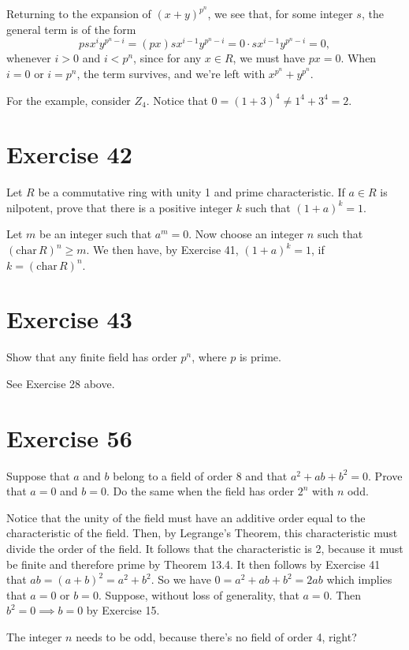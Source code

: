\documentclass[12pt]{article}
\newcommand{\chr}{\mbox{char}\,}
\begin{document}
Returning to the expansion of $(x+y)^{p^n}$, we see that, for some
integer $s$, the general term is of the form
\begin{equation*}
psx^iy^{p^n-i}=(px)sx^{i-1}y^{p^n-i}=0\cdot sx^{i-1}y^{p^n-i}=0,
\end{equation*}
whenever $i>0$ and $i<p^n$, since for any $x\in R$, we must have $px=0$.
When $i=0$ or $i=p^n$, the term survives, and we're left with $x^{p^n}+y^{p^n}$.

For the example, consider $Z_4$.  Notice that $0=(1+3)^4\neq 1^4+3^4=2$.

\section*{Exercise 42}

Let $R$ be a commutative ring with unity 1 and prime characteristic.  If
$a\in R$ is nilpotent, prove that there is a positive integer $k$ such that
$(1+a)^k=1$.

Let $m$ be an integer such that $a^m=0$.
Now choose an integer $n$ such that $(\chr R)^n\geq m$.
We then have, by Exercise 41, $(1+a)^k=1$, if $k=(\chr R)^n$.

\section*{Exercise 43}

Show that any finite field has order $p^n$, where $p$ is prime.

See Exercise 28 above.

\section*{Exercise 56}

Suppose that $a$ and $b$ belong to a field of order 8 and that $a^2+ab+b^2=0$.
Prove that $a=0$ and $b=0$.  Do the same when the field has order $2^n$ with $n$ odd.

Notice that the unity of the field must have an additive order equal to
the characteristic of the field.  Then, by Legrange's Theorem, this characteristic
must divide the order of the field.  It follows that the characteristic is 2, because
it must be finite and therefore prime by Theorem 13.4.  It then
follows by Exercise 41 that $ab=(a+b)^2=a^2+b^2$.
So we have $0=a^2+ab+b^2=2ab$ which implies that $a=0$ or $b=0$.
Suppose, without loss of generality, that $a=0$.  Then $b^2=0\implies b=0$
by Exercise 15.

The integer $n$ needs to be odd, because there's no field of order 4, right?
\end{document}
